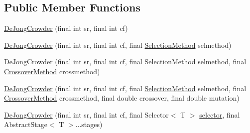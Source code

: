\subsection*{Public Member Functions}
\begin{CompactItemize}
\item 
\hyperlink{classjenes_1_1stage_1_1operator_1_1common_1_1_de_jong_crowder_3_01_t_01extends_01_chromosome_01_4_3a856be20539434c822eecf5fc099657}{DeJongCrowder} (final int sr, final int cf)
\item 
\hyperlink{classjenes_1_1stage_1_1operator_1_1common_1_1_de_jong_crowder_3_01_t_01extends_01_chromosome_01_4_552f2f1d77a10c3ae9fb8c94924fb798}{DeJongCrowder} (final int sr, final int cf, final \hyperlink{classjenes_1_1stage_1_1operator_1_1common_1_1_de_jong_crowder_3_01_t_01extends_01_chromosome_01_4_4c04a136973e222068a9b2bad6593645}{SelectionMethod} selmethod)
\item 
\hyperlink{classjenes_1_1stage_1_1operator_1_1common_1_1_de_jong_crowder_3_01_t_01extends_01_chromosome_01_4_50f143494ddff28214ac72497b0de52a}{DeJongCrowder} (final int sr, final int cf, final \hyperlink{classjenes_1_1stage_1_1operator_1_1common_1_1_de_jong_crowder_3_01_t_01extends_01_chromosome_01_4_4c04a136973e222068a9b2bad6593645}{SelectionMethod} selmethod, final \hyperlink{classjenes_1_1stage_1_1operator_1_1common_1_1_de_jong_crowder_3_01_t_01extends_01_chromosome_01_4_cd306135cc2dd505a1a981b36f4696ea}{CrossoverMethod} crossmethod)
\item 
\hyperlink{classjenes_1_1stage_1_1operator_1_1common_1_1_de_jong_crowder_3_01_t_01extends_01_chromosome_01_4_31f097247f16221e2074ddc05d198349}{DeJongCrowder} (final int sr, final int cf, final \hyperlink{classjenes_1_1stage_1_1operator_1_1common_1_1_de_jong_crowder_3_01_t_01extends_01_chromosome_01_4_4c04a136973e222068a9b2bad6593645}{SelectionMethod} selmethod, final \hyperlink{classjenes_1_1stage_1_1operator_1_1common_1_1_de_jong_crowder_3_01_t_01extends_01_chromosome_01_4_cd306135cc2dd505a1a981b36f4696ea}{CrossoverMethod} crossmethod, final double crossover, final double mutation)
\item 
\hyperlink{classjenes_1_1stage_1_1operator_1_1common_1_1_de_jong_crowder_3_01_t_01extends_01_chromosome_01_4_97d47f09a66cf05e1cfb7630410de686}{DeJongCrowder} (final int sr, final int cf, final Selector$<$ T $>$ \hyperlink{classjenes_1_1stage_1_1operator_1_1common_1_1_de_jong_crowder_3_01_t_01extends_01_chromosome_01_4_6486b0225d345afd81b86dd04772d5ba}{selector}, final AbstractStage$<$ T $>$...stages)
\item 

\end{CompactItemize}
